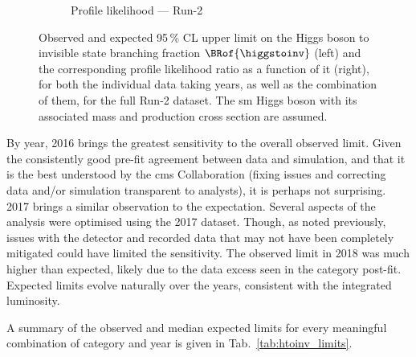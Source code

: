 \begin{figure}[htbp]
\begin{subfigure}[t]{0.45\textwidth}
        \caption{Profile likelihood --- Run-2}
    \end{subfigure}
    \caption[Observed and expected 95\,\% CL upper limit on the Higgs boson to invisible state branching fraction $\BRof{\higgstoinv}$ and the corresponding profile likelihood ratio as a function of it, for both the individual data taking years, as well as the combination of them, for the full Run-2 dataset]{Observed and expected 95\,\% CL upper limit on the Higgs boson to invisible state branching fraction $\BRof{\higgstoinv}$ (left) and the corresponding profile likelihood ratio as a function of it (right), for both the individual data taking years, as well as the combination of them, for the full Run-2 dataset. The \acrlong{sm} Higgs boson with its associated mass and production cross section are assumed.}
    \label{fig:htoinv_limit_likelihood_Run2_per_year}
\end{figure}

By year, 2016 brings the greatest sensitivity to the overall observed limit. Given the consistently good pre-fit agreement between data and simulation, and that it is the best understood by the \acrshort{cms} Collaboration (fixing issues and correcting data and/or simulation transparent to analysts), it is perhaps not surprising. 2017 brings a similar observation to the expectation. Several aspects of the analysis were optimised using the 2017 dataset. Though, as noted previously, issues with the detector and recorded data that may not have been completely mitigated could have limited the sensitivity. The observed limit in 2018 was much higher than expected, likely due to the data excess seen in the \VH category post-fit. Expected limits evolve naturally over the years, consistent with the integrated luminosity.

A summary of the observed and median expected limits for every meaningful combination of category and year is given in Tab.~\ref{tab:htoinv_limits}.

